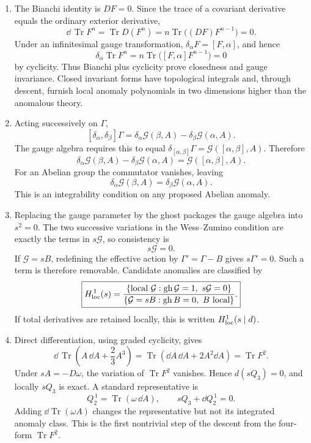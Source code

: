 \begin{enumerate}
  \begin{enumerate}
    \item[(a)]
    The Bianchi identity is \(DF=0\).  Since the trace of a covariant
    derivative equals the ordinary exterior derivative,
    \[
      \dd\,\operatorname{Tr}F^n
        =\operatorname{Tr}D(F^n)
        =n\operatorname{Tr}\bigl((DF)F^{n-1}\bigr)=0.
    \]
    Under an infinitesimal gauge transformation,
    \(\delta_\alpha F=[F,\alpha]\), and hence
    \[
      \delta_\alpha\operatorname{Tr}F^n
        =n\operatorname{Tr}\bigl([F,\alpha]F^{n-1}\bigr)=0
    \]
    by cyclicity.  Thus Bianchi plus cyclicity prove closedness and gauge
    invariance.  Closed invariant forms have topological integrals and,
    through descent, furnish local anomaly polynomials in two dimensions
    higher than the anomalous theory.
    \item[(b)]
    Acting successively on \(\Gamma\),
    \[
      [\delta_\alpha,\delta_\beta]\Gamma
        =\delta_\alpha\mathcal G(\beta,A)
         -\delta_\beta\mathcal G(\alpha,A).
    \]
    The gauge algebra requires this to equal
    \(\delta_{[\alpha,\beta]}\Gamma
      =\mathcal G([\alpha,\beta],A)\).  Therefore
    \[
      \boxed{\delta_\alpha\mathcal G(\beta,A)
        -\delta_\beta\mathcal G(\alpha,A)
        =\mathcal G([\alpha,\beta],A).}
    \]
    For an Abelian group the commutator vanishes, leaving
    \[
      \delta_\alpha\mathcal G(\beta,A)
        =\delta_\beta\mathcal G(\alpha,A).
    \]
    This is an integrability condition on any proposed Abelian anomaly.
    \item[(c)]
    Replacing the gauge parameter by the ghost packages the gauge algebra
    into \(s^2=0\).  The two successive variations in the Wess--Zumino
    condition are exactly the terms in \(s\mathcal G\), so consistency is
    \[
      s\mathcal G=0.
    \]
    If \(\mathcal G=sB\), redefining the effective action by
    \(\Gamma'=\Gamma-B\) gives \(s\Gamma'=0\).  Such a term is therefore
    removable.  Candidate anomalies are classified by
    \[
      \boxed{H_{\rm loc}^{\,1}(s)
        =\frac{\{\text{local }\mathcal G:\operatorname{gh}\mathcal G=1,
            \ s\mathcal G=0\}}
         {\{\mathcal G=sB:\operatorname{gh}B=0,\ B\text{ local}\}}.}
    \]
    If total derivatives are retained locally, this is written
    \(H_{\rm loc}^{1}(s\mid d)\).
    \item[(d)]
    Direct differentiation, using graded cyclicity, gives
    \[
      \dd\,\operatorname{Tr}\left(A\,\dd A+\frac23A^3\right)
        =\operatorname{Tr}\left(\dd A\,\dd A+2A^2\dd A\right)
        =\operatorname{Tr}F^2.
    \]
    Under \(sA=-D\omega\), the variation of
    \(\operatorname{Tr}F^2\) vanishes.  Hence \(d(sQ_3)=0\), and locally
    \(sQ_3\) is exact.  A standard representative is
    \[
      \boxed{Q_2^{\,1}=\operatorname{Tr}(\omega\,\dd A),\qquad
        sQ_3+\dd Q_2^{\,1}=0.}
    \]
    Adding \(\dd\operatorname{Tr}(\omega A)\) changes the representative
    but not its integrated anomaly class.  This is the first nontrivial
    step of the descent from the four-form \(\operatorname{Tr}F^2\).
  \end{enumerate}


\end{enumerate}
